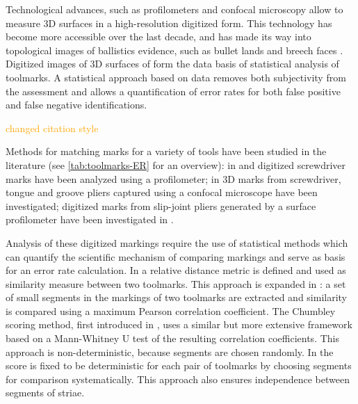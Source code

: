 \documentclass[12pt]{article}
\begin{document}
Technological advances, such as profilometers and confocal microscopy
allow to measure 3D surfaces in a high-resolution digitized form. This
technology has become more accessible over the last decade, and has made
its way into topological images of ballistics evidence, such as bullet
lands and breech faces
\cite{DeKinder1, DeKinder2, Bachrach1, vorburger2016}. Digitized images
of 3D surfaces of form the data basis of statistical analysis of
toolmarks. A statistical approach based on data removes both
subjectivity from the assessment and allows a quantification of error
rates for both false positive and false negative identifications.

{\textcolor{orange}{changed citation style}}

Methods for matching marks for a variety of tools have been studied in
the literature (see \autoref{tab:toolmarks-ER} for an overview): in
\cite{manytoolmarks1} and \cite{chumbley} digitized screwdriver marks
have been analyzed using a profilometer; in \cite{manytoolmarks2} 3D
marks from screwdriver, tongue and groove pliers captured using a
confocal microscope have been investigated; digitized marks from
slip-joint pliers generated by a surface profilometer have been
investigated in \cite{afte-chumbley}.

Analysis of these digitized markings require the use of statistical
methods which can quantify the scientific mechanism of comparing
markings and serve as basis for an error rate calculation. In
\cite{manytoolmarks2} a relative distance metric is defined and used as
similarity measure between two toolmarks. This approach is expanded in
\citet{manytoolmarks1}: a set of small segments in the markings of two
toolmarks are extracted and similarity is compared using a maximum
Pearson correlation coefficient. The Chumbley scoring method, first
introduced in \cite{chumbley}, uses a similar but more extensive
framework based on a Mann-Whitney U test of the resulting correlation
coefficients. This approach is non-deterministic, because segments are
chosen randomly. In \cite{hadler} the score is fixed to be deterministic
for each pair of toolmarks by choosing segments for comparison
systematically. This approach also ensures independence between segments
of striae.
\end{document}
